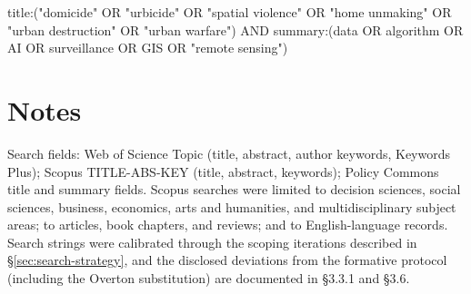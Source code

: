 {\small\ttfamily\raggedright title:("domicide" OR "urbicide" OR "spatial violence" OR "home unmaking" OR "urban destruction" OR "urban warfare") AND summary:(data OR algorithm OR AI OR surveillance OR GIS OR "remote sensing")\par}

\section{Notes}

Search fields: Web of Science Topic (title, abstract, author keywords, Keywords Plus); Scopus TITLE-ABS-KEY (title, abstract, keywords); Policy Commons title and summary fields. Scopus searches were limited to decision sciences, social sciences, business, economics, arts and humanities, and multidisciplinary subject areas; to articles, book chapters, and reviews; and to English-language records. Search strings were calibrated through the scoping iterations described in \S\ref{sec:search-strategy}, and the disclosed deviations from the formative protocol (including the Overton substitution) are documented in \S 3.3.1 and \S 3.6.
